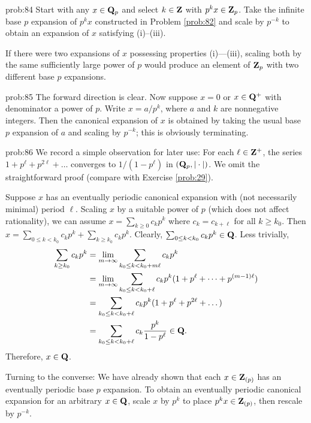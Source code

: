 \begin{sol}{prob:84} Start with any $x\in \mathbf{Q}_p$ and select $k\in \mathbf{Z}$ with $p^k x \in \mathbf{Z}_p$. Take the infinite base $p$ expansion of $p^k x$ constructed in Problem \ref{prob:82} and scale by $p^{-k}$ to obtain an expansion of $x$ satisfying (i)--(iii).

If there were two expansions of $x$ possessing properties (i)---(iii), scaling both by the same sufficiently large power of $p$ would produce an element of $\mathbf{Z}_p$ with two different base $p$ expansions.
\end{sol}

\begin{sol}{prob:85} The forward direction is clear. Now suppose $x=0$ or $x\in \mathbf{Q}^{+}$ with denominator a power of $p$. Write $x=a/p^k$, where $a$ and $k$ are nonnegative integers. Then the canonical expansion of $x$ is obtained by taking the usual base $p$ expansion of $a$ and scaling by $p^{-k}$; this is obviously terminating.
\end{sol}

\begin{sol}{prob:86} We record a simple observation for later use: For each $\ell\in\mathbf{Z}^{+}$, the series $1+p^{\ell}+p^{2\ell} + \dots$ converges to $1/(1-p^{\ell})$ in $(\mathbf{Q}_p,|\cdot|)$. We omit the straightforward proof (compare with Exercise \ref{prob:29}).

Suppose $x$ has an eventually periodic canonical expansion with (not necessarily minimal) period $\ell$. Scaling $x$ by a suitable power of $p$ (which does not affect rationality), we can assume $x= \sum_{k\ge 0} c_k p^k$ where $c_k = c_{k+\ell}$ for all $k\ge k_0$. Then
$x = \sum_{0 \le k < k_0} c_k p^k + \sum_{k \ge k_0} c_k p^k$. Clearly, $\sum_{0 \le k < k_0} c_k p^k \in \mathbf{Q}$. Less trivially,
\begin{align*} \sum_{k \ge k_0} c_k p^k &= \lim_{m\to\infty} \sum_{k_0 \le k 
< k_0+m\ell} c_k p^k \\
&= \lim_{m\to\infty} \sum_{k_0 \le k < k_0+\ell} c_k p^k (1+p^{\ell} + \dots + p^{(m-1)\ell}) \\
&= \sum_{k_0 \le k < k_0+\ell} c_k p^{k} (1+p^{\ell} + p^{2\ell} + \dots)\\
&= \sum_{k_0 \le k < k_0+\ell} c_k \frac{p^k}{1-p^{\ell}} \in \mathbf{Q}.
\end{align*}
Therefore, $x\in \mathbf{Q}$.

Turning to the converse: We have already shown that each $x\in \mathbf{Z}_{(p)}$ has an eventually periodic base $p$ expansion. To obtain an eventually periodic canonical expansion for an arbitrary $x \in \mathbf{Q}$, scale $x$ by $p^k$ to place $p^k x \in \mathbf{Z}_{(p)}$, then rescale by $p^{-k}$.
\end{sol}

